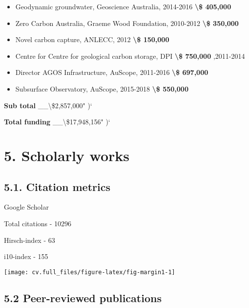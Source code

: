 \documentclass[
]{article}
\providecommand{\tightlist}{%
  \setlength{\itemsep}{0pt}\setlength{\parskip}{0pt}}
\begin{document}
\begin{itemize}
\tightlist
\item
  Geodynamic groundwater, Geoscience Australia, 2014-2016
  \textbf{\textbackslash\$ 405,000}
\item
  Zero Carbon Australia, Graeme Wood Foundation, 2010-2012
  \textbf{\textbackslash\$ 350,000}
\item
  Novel carbon capture, ANLECC, 2012 \textbf{\textbackslash\$ 150,000}
\item
  Centre for Centre for geological carbon storage, DPI
  \textbf{\textbackslash\$ 750,000} ,2011-2014
\item
  Director AGOS Infrastructure, AuScope, 2011-2016
  \textbf{\textbackslash\$ 697,000}
\item
  Subsurface Observatory, AuScope, 2015-2018 \textbf{\textbackslash\$
  550,000}
\end{itemize}

\textbf{Sub total} \_\_\textbackslash\$2,857,000" )`

\textbf{Total funding } \_\_\textbackslash\$17,948,156" )`

\hypertarget{scholarly-works}{%
\section{5. Scholarly works}\label{scholarly-works}}

\hypertarget{citation-metrics}{%
\subsection{5.1. Citation metrics}\label{citation-metrics}}

Google Scholar

Total citations - 10296

Hirsch-index - 63

i10-index - 155

\begin{flushright}\texttt{[image: cv.full\_files/figure-latex/fig-margin1-1]} \end{flushright}

\hypertarget{peer-reviewed-publications}{%
\subsection{5.2 Peer-reviewed
publications}\label{peer-reviewed-publications}}
\end{document}
